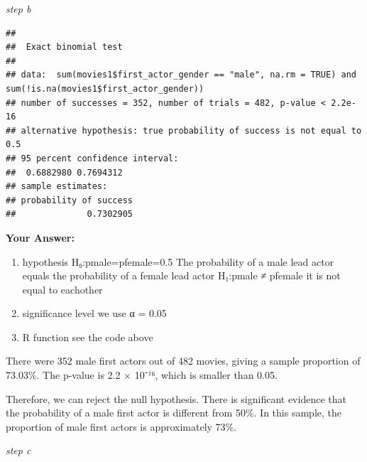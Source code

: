 \documentclass[
]{article}
\newenvironment{Shaded}{\begin{snugshade}}{\end{snugshade}}
\newcommand{\AttributeTok}[1]{\textcolor[rgb]{0.13,0.29,0.53}{#1}}
\newcommand{\ConstantTok}[1]{\textcolor[rgb]{0.56,0.35,0.01}{#1}}
\newcommand{\FloatTok}[1]{\textcolor[rgb]{0.00,0.00,0.81}{#1}}
\newcommand{\FunctionTok}[1]{\textcolor[rgb]{0.13,0.29,0.53}{\textbf{#1}}}
\newcommand{\NormalTok}[1]{#1}
\newcommand{\SpecialCharTok}[1]{\textcolor[rgb]{0.81,0.36,0.00}{\textbf{#1}}}
\newcommand{\StringTok}[1]{\textcolor[rgb]{0.31,0.60,0.02}{#1}}
\begin{document}
\emph{step b}

\begin{Shaded}
\end{Shaded}

\begin{verbatim}
## 
##  Exact binomial test
## 
## data:  sum(movies1$first_actor_gender == "male", na.rm = TRUE) and sum(!is.na(movies1$first_actor_gender))
## number of successes = 352, number of trials = 482, p-value < 2.2e-16
## alternative hypothesis: true probability of success is not equal to 0.5
## 95 percent confidence interval:
##  0.6882980 0.7694312
## sample estimates:
## probability of success 
##              0.7302905
\end{verbatim}

\textbf{Your Answer:}

\begin{enumerate}
\def\labelenumi{\arabic{enumi}.}
\item
  hypothesis H₀:pmale=pfemale=0.5 The probability of a male lead actor
  equals the probability of a female lead actor H₁:pmale ≠ pfemale it is
  not equal to eachother
\item
  significance level we use α = 0.05
\item
  R function see the code above
\end{enumerate}

There were 352 male first actors out of 482 movies, giving a sample
proportion of 73.03\%. The p-value is 2.2 × 10⁻¹⁶, which is smaller than
0.05.

Therefore, we can reject the null hypothesis. There is significant
evidence that the probability of a male first actor is different from
50\%. In this sample, the proportion of male first actors is
approximately 73\%.

\emph{step c}
\end{document}
